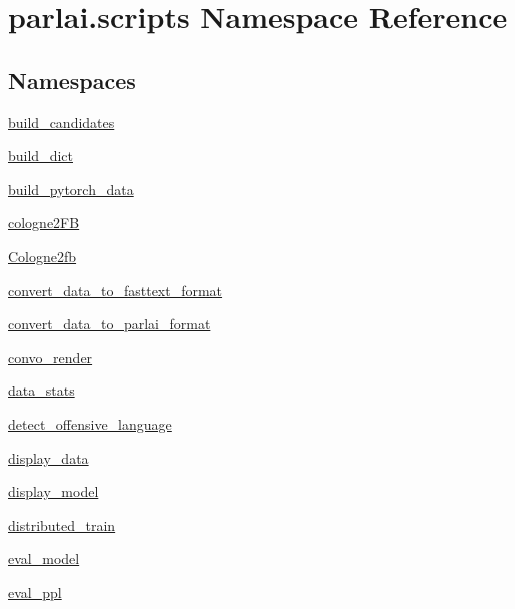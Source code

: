 \hypertarget{namespaceparlai_1_1scripts}{}\section{parlai.\+scripts Namespace Reference}
\label{namespaceparlai_1_1scripts}
\subsection*{Namespaces}
\begin{DoxyCompactItemize}
\item 
 \hyperlink{namespaceparlai_1_1scripts_1_1build__candidates}{build\+\_\+candidates}
\item 
 \hyperlink{namespaceparlai_1_1scripts_1_1build__dict}{build\+\_\+dict}
\item 
 \hyperlink{namespaceparlai_1_1scripts_1_1build__pytorch__data}{build\+\_\+pytorch\+\_\+data}
\item 
 \hyperlink{namespaceparlai_1_1scripts_1_1cologne2FB}{cologne2\+FB}
\item 
 \hyperlink{namespaceparlai_1_1scripts_1_1Cologne2fb}{Cologne2fb}
\item 
 \hyperlink{namespaceparlai_1_1scripts_1_1convert__data__to__fasttext__format}{convert\+\_\+data\+\_\+to\+\_\+fasttext\+\_\+format}
\item 
 \hyperlink{namespaceparlai_1_1scripts_1_1convert__data__to__parlai__format}{convert\+\_\+data\+\_\+to\+\_\+parlai\+\_\+format}
\item 
 \hyperlink{namespaceparlai_1_1scripts_1_1convo__render}{convo\+\_\+render}
\item 
 \hyperlink{namespaceparlai_1_1scripts_1_1data__stats}{data\+\_\+stats}
\item 
 \hyperlink{namespaceparlai_1_1scripts_1_1detect__offensive__language}{detect\+\_\+offensive\+\_\+language}
\item 
 \hyperlink{namespaceparlai_1_1scripts_1_1display__data}{display\+\_\+data}
\item 
 \hyperlink{namespaceparlai_1_1scripts_1_1display__model}{display\+\_\+model}
\item 
 \hyperlink{namespaceparlai_1_1scripts_1_1distributed__train}{distributed\+\_\+train}
\item 
 \hyperlink{namespaceparlai_1_1scripts_1_1eval__model}{eval\+\_\+model}
\item 
 \hyperlink{namespaceparlai_1_1scripts_1_1eval__ppl}{eval\+\_\+ppl}
\item 

\end{DoxyCompactItemize}
